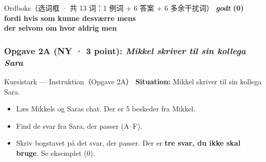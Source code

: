 \begin{grammatikbox}{Ordboks（选词框 · 共 13 词：1 例词 + 6 答案 + 6 多余干扰词）}
\centering
\large\bfseries\color{NCDNavy}
\textcolor{NCDGray}{\textit{godt} {\small (0)}} \qquad fordi \qquad hvis \qquad som \qquad kunne \qquad desværre \qquad mens\\[0.25em]
der \qquad selvom \qquad om \qquad hvor \qquad aldrig \qquad men
\end{grammatikbox}

\subsubsection*{Opgave 2A (NY · 3 point): \textit{Mikkel skriver til sin kollega Sara}}

\begin{emailbox}{Kursistark --- Instruktion（Opgave 2A）}
\textbf{Situation:} Mikkel skriver til sin kollega Sara.
\begin{itemize}
  \item Læs Mikkels og Saras chat. Der er 5 beskeder fra Mikkel.
  \item Find de svar fra Sara, der passer (A--F).
  \item Skriv bogstavet på det svar, der passer. Der er \textbf{tre svar, du ikke skal bruge}. Se eksemplet (0).
\end{itemize}
\end{emailbox}

